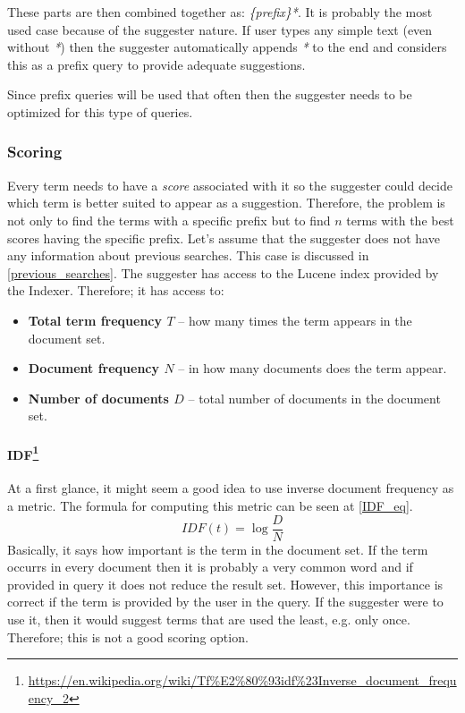 These parts are then combined together as: \textit{\{prefix\}*}.
It is probably the most used case because of the suggester nature. If user types any simple text (even without \textit{*}) then
the suggester automatically appends \textit{*} to the end and considers this as a prefix query to provide adequate suggestions.

Since prefix queries will be used that often then the suggester needs to be optimized for this type of queries.

\subsubsection{Scoring}
\label{prefix_scoring}
Every term needs to have a \textit{score} associated with it so the suggester could decide which term is better suited
to appear as a suggestion. Therefore, the problem is not only to find the terms with a specific prefix but to find $n$
terms with the best scores having the specific prefix. Let's assume that the suggester does not have any information
about previous searches. This case is discussed in
\ref{previous_searches}. The suggester has access to the Lucene index provided by the Indexer. %
Therefore; it has access to:
\begin{itemize}
    \item \textbf{Total term frequency $T$} – how many times the term appears in the document set.
    \item \textbf{Document frequency $N$} – in how many documents does the term appear.
    \item \textbf{Number of documents $D$} – total number of documents in the document set.
\end{itemize}

\paragraph{IDF\protect\footnote{\url{https://en.wikipedia.org/wiki/Tf\%E2\%80\%93idf\%23Inverse\_document\_frequency\_2}}}
At a first glance, it might seem a good idea to use inverse document frequency as a metric. The formula for computing this metric can be seen at \ref{IDF_eq}.
\begin{equation}
\label{IDF_eq}
IDF(t) = \log{\frac{D}{N}}
\end{equation}
Basically, it says how important is the term in the document set. If the term occurrs in every document then it is probably
a very common word and if provided in query it does not reduce the result set.
However, this importance is correct if the term is
provided by the user in the query. If the suggester were to use it, then it would suggest terms that are used the least, e.g. only once.
Therefore; this is not a good scoring option.

